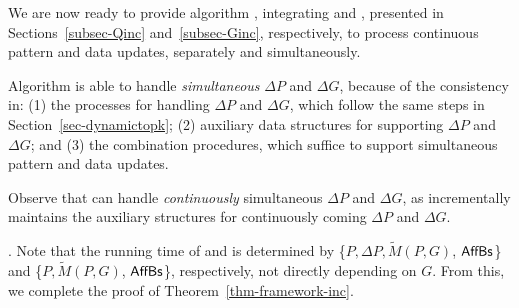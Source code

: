 We are now ready to provide algorithm \inc, integrating \incp and \incd, presented in Sections~\ref{subsec-Qinc} and~\ref{subsec-Ginc}, respectively, to process continuous pattern and data updates, separately and simultaneously.

Algorithm \inc is able to handle {\em simultaneous} $\Delta P$ and $\Delta G$, because of the consistency in:
(1) the processes for handling $\Delta P$ and $\Delta G$, which follow the same steps in Section~\ref{sec-dynamictopk};
(2) auxiliary data structures for supporting $\Delta P$ and $\Delta G$; and
(3) the combination procedures, which suffice to support simultaneous pattern and data updates.

Observe that \inc can handle {\em continuously} simultaneous $\Delta P$ and $\Delta G$,
as \inc incrementally maintains the auxiliary structures for continuously coming $\Delta P$ and $\Delta G$.




. Note that the running time of \incp and \incd is determined by \{$P, \Delta P, \tilde{M}(P,G)$, ${\mathsf{AffBs}}$\}
and \{$P, \tilde{M}(P,G)$, ${\mathsf{AffBs}}$\}, respectively, not directly depending on $G$.
From this, we complete the proof of Theorem~\ref{thm-framework-inc}.
